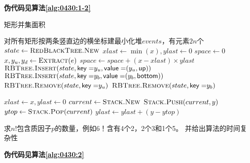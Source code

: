 \begin{questions}
\begin{parts}
\begin{solution}
            \textbf{伪代码见算法\ref{alg:0430:1-2}}
        \end{solution}

        \begin{algorithm}[!ht]
            \caption{矩形并集面积}\label{alg:0430:1-2}
            \begin{algorithmic}[1]
                 
                \State 对所有矩形按两条竖直边的横坐标建最小化堆$events$，有元素$2n$个 
                \State $state \gets \Call{RedBlackTree.New}{}$
                \State $xlast \gets \min(x), ylast \gets 0$
                \State $space \gets 0$
                \State $x, y_u, y_d \gets \Call{Extract}{e}$
                \State $space \gets space + (x-xlast) \times ylast$
                 
                \State $\Call{RBTree.Insert}{state, \mathsf{key=}y_u, \mathsf{value=}(y_u, \mathsf{up})}$
                \State $\Call{RBTree.Insert}{state, \mathsf{key=}y_b, \mathsf{value=}(y_b, \mathsf{bottom})}$
                 
                \State $\Call{RBTree.Remove}{state, \mathsf{key=}y_u}$
                \State $\Call{RBTree.Remove}{state, \mathsf{key=}y_b}$
                \EndIf

                \State $xlast \gets x, ylast \gets 0$ 
                \State $current \gets \Call{Stack.New}{}$
                \State $\Call{Stack.Push}{current, y}$
                \State $ytop \gets \Call{Stack.Pop}{current}$
                \State $ylast \gets ylast + (y - ytop)$
                \EndIf
                \EndIf
                \EndFor
                \EndFor
            \end{algorithmic}
        \end{algorithm}
    \end{parts}

    \question 求$n!$包含质因子$p$的数量，例如$6！$含有4个2，2个3和1个5。
    并给出算法的时间复杂性

    \begin{solution}
        \textbf{伪代码见算法\ref{alg:0430:2}}


\end{solution}
\end{questions}
